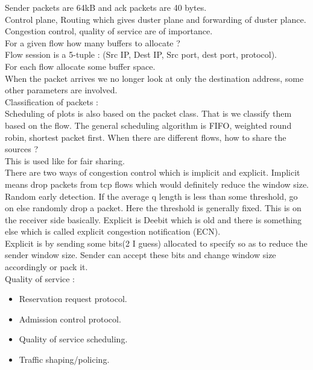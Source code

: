 \documentclass[solution,addpoints,12pt]{exam}
\begin{document}
Sender packets are 64kB and ack packets are 40 bytes.\\
Control plane, Routing which gives duster plane and forwarding
of duster plance.\\

Congestion control, quality of service are of importance.\\
For a given flow how many buffers to allocate ?\\
Flow session is a 5-tuple : (Src IP, Dest IP, Src port, dest port, protocol).\\
For each flow allocate some buffer space.\\

When the packet arrives we no longer look at only the destination address,
some other parameters are involved.\\

Classification of packets :\\
Scheduling of plots is also based on the packet class. That is we classify them
based on the flow. The general scheduling algorithm is FIFO, weighted round robin,
shortest packet first. When there are different flows, how to share the sources ?\\
This is used like for fair sharing.\\
There are two ways of congestion control which is implicit and explicit.
Implicit means drop packets from tcp flows which would definitely reduce the
window size. Random early detection. If the average q length is less than some
threshold, go on else randomly drop a packet. Here the threshold is generally fixed.
This is on the receiver side basically. Explicit is Deebit which is old and
there is something else which is called explicit
congestion notification (ECN).\\

Explicit is by sending some bits(2 I guess) allocated to specify so as to reduce the
sender window size. Sender can accept these bits and change window size accordingly
or pack it.\\

Quality of service :\\
\begin{itemize}
\item Reservation request protocol.
\item Admission control protocol.
\item Quality of service scheduling.
\item Traffic shaping/policing.
\end{itemize}
\end{document}
